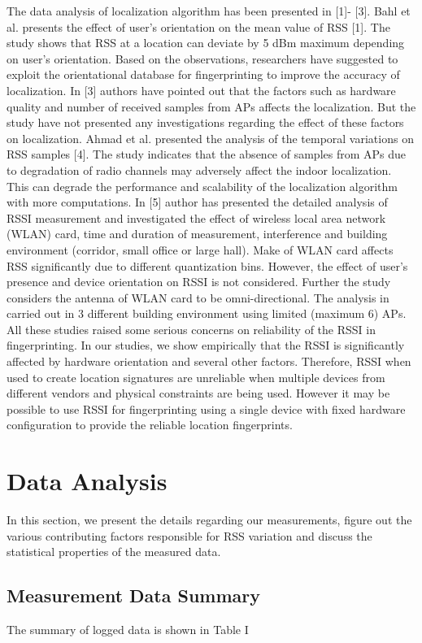 \documentclass[conference]{IEEEtran}
\begin{document}
The data analysis of localization algorithm has been presented in [1]- [3]. Bahl et al. presents the effect of user’s
orientation on the mean value of RSS [1]. The study shows
that RSS at a location can deviate by 5 dBm maximum
depending on user’s orientation. Based on the observations,
researchers have suggested to exploit the orientational database
for fingerprinting to improve the accuracy of localization. In
[3] authors have pointed out that the factors such as hardware
quality and number of received samples from APs affects the
localization. But the study have not presented any investigations regarding the effect of these factors on localization.
Ahmad et al. presented the analysis of the temporal variations
on RSS samples [4]. The study indicates that the absence of
samples from APs due to degradation of radio channels may
adversely affect the indoor localization. This can degrade the
performance and scalability of the localization algorithm with
more computations. In [5] author has presented the detailed
analysis of RSSI measurement and investigated the effect of
wireless local area network (WLAN) card, time and duration
of measurement, interference and building environment (corridor, small office or large hall). Make of WLAN card affects
RSS significantly due to different quantization bins. However,
the effect of user’s presence and device orientation on RSSI
is not considered. Further the study considers the antenna of
WLAN card to be omni-directional. The analysis in carried out
in 3 different building environment using limited (maximum
6) APs.
All these studies raised some serious concerns on reliability
of the RSSI in fingerprinting. In our studies, we show empirically that the RSSI is significantly affected by hardware orientation and several other factors. Therefore, RSSI when used to
create location signatures are unreliable when multiple devices
from different vendors and physical constraints are being used.
However it may be possible to use RSSI for fingerprinting
using a single device with fixed hardware configuration to
provide the reliable location fingerprints.

	
\section{Data Analysis}
In this section, we present the details regarding our measurements, figure out the various contributing factors responsible
for RSS variation and discuss the statistical properties of the
measured data.
	\subsection{Measurement Data Summary}
	The summary of logged data is shown in Table I
	
\end{document}
